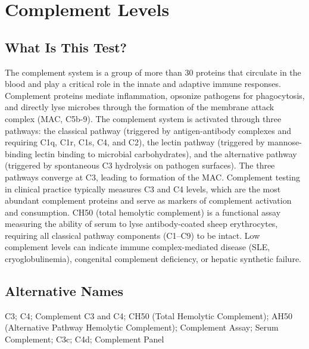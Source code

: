 \chapter{Complement Levels}

\section*{What Is This Test?}
The complement system is a group of more than 30 proteins that circulate in the blood and play a critical role in the innate and adaptive immune responses. Complement proteins mediate inflammation, opsonize pathogens for phagocytosis, and directly lyse microbes through the formation of the membrane attack complex (MAC, C5b-9). The complement system is activated through three pathways: the classical pathway (triggered by antigen-antibody complexes and requiring C1q, C1r, C1s, C4, and C2), the lectin pathway (triggered by mannose-binding lectin binding to microbial carbohydrates), and the alternative pathway (triggered by spontaneous C3 hydrolysis on pathogen surfaces). The three pathways converge at C3, leading to formation of the MAC. Complement testing in clinical practice typically measures C3 and C4 levels, which are the most abundant complement proteins and serve as markers of complement activation and consumption. CH50 (total hemolytic complement) is a functional assay measuring the ability of serum to lyse antibody-coated sheep erythrocytes, requiring all classical pathway components (C1--C9) to be intact. Low complement levels can indicate immune complex-mediated disease (SLE, cryoglobulinemia), congenital complement deficiency, or hepatic synthetic failure.

\section*{Alternative Names}
C3; C4; Complement C3 and C4; CH50 (Total Hemolytic Complement); AH50 (Alternative Pathway Hemolytic Complement); Complement Assay; Serum Complement; C3c; C4d; Complement Panel

